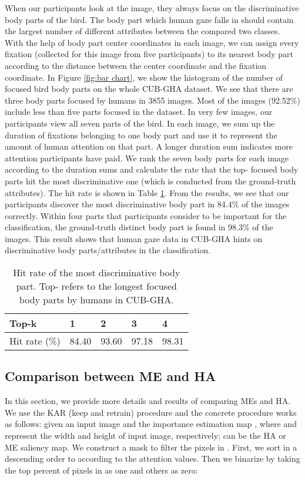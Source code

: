 \documentclass{bmvc2k}
\begin{document}
When our participants look at the image, they always focus on the discriminative body parts of the bird. The body part which human gaze falls in should contain the largest number of different attributes between the compared two classes. With the help of body part center coordinates in each image, we can assign every fixation (collected for this image from five participants) to its nearest body part according to the distance between the center coordinate and the fixation coordinate. In Figure \ref{fig:bar chart}, we show the histogram of the number of focused bird body parts on the whole CUB-GHA dataset. We see that there are three body parts focused by humans in 3855 images. Most of the images (92.52\%) include less than five parts focused in the dataset. In very few images, our participants view all seven parts of the bird. In each image, we sum up the duration of fixations belonging to one body part and use it to represent the amount of human attention on that part. A longer duration sum indicates more attention participants have paid. We rank the seven body parts for each image according to the duration sums and calculate the rate that the top- focused body parts hit the most discriminative one (which is conducted from the ground-truth attributes). The hit rate is shown in Table \ref{tab:hit rate}.
From the results, we see that our participants discover the most discriminative body part in 84.4\% of the images correctly. Within four parts that participants consider to be important for the classification, the ground-truth distinct body part is found in 98.3\% of the images. This result shows that human gaze data in CUB-GHA hints on discriminative body parts/attributes in the classification.

\begin{table}[h]
\centering
\begin{tabular}{|l|l|l|l|l|}
\hline
Top-k         & 1     & 2     & 3     & 4     \\ \hline\hline
Hit rate (\%) & 84.40 & 93.60 & 97.18 & 98.31 \\ \hline
\end{tabular}
\vspace{0.5cm}
\caption{Hit rate of the most discriminative body part. Top- refers to the  longest focused body parts by humans in CUB-GHA.}
\label{tab:hit rate}
\end{table}


\subsection{Comparison between ME and HA}
In this section, we provide more details and results of comparing MEs and HA. We use the KAR (keep and retrain) procedure \cite{hooker2018benchmark} and the concrete procedure works as follows: given an input image  and the importance estimation map , where  and  represent the width and height of input image, respectively;  can be the HA or ME saliency map. We construct a mask  to filter the pixels in . First, we sort  in a descending order to  according to the attention values. Then we binarize  by taking the top  percent of pixels in  as one and others as zero:
\end{document}

